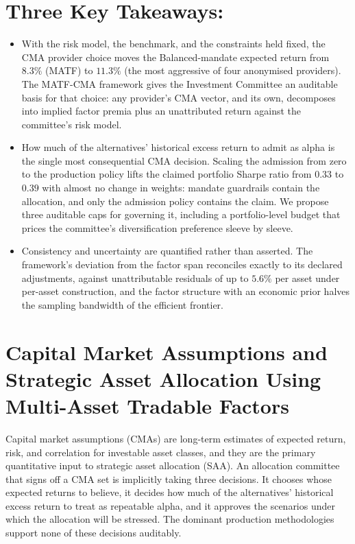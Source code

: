 \documentclass[pdftex,12pt,a4paper]{article}
\begin{document}
\newpage

\sectionfont{\MakeUppercase}

\section*{Three Key Takeaways:}
\begin{itemize}[itemsep=2pt]
	\item With the risk model, the benchmark, and the constraints held fixed, the CMA provider choice moves the Balanced-mandate expected return from $8.3\%$ (MATF) to $11.3\%$ (the most aggressive of four anonymised providers). The MATF-CMA framework gives the Investment Committee an auditable basis for that choice: any provider's CMA vector, and its own, decomposes into implied factor premia plus an unattributed return against the committee's risk model.
	\item How much of the alternatives' historical excess return to admit as alpha is the single most consequential CMA decision. Scaling the admission from zero to the production policy lifts the claimed portfolio Sharpe ratio from $0.33$ to $0.39$ with almost no change in weights: mandate guardrails contain the allocation, and only the admission policy contains the claim. We propose three auditable caps for governing it, including a portfolio-level budget that prices the committee's diversification preference sleeve by sleeve.
	\item Consistency and uncertainty are quantified rather than asserted. The framework's deviation from the factor span reconciles exactly to its declared adjustments, against unattributable residuals of up to $5.6\%$ per asset under per-asset construction, and the factor structure with an economic prior halves the sampling bandwidth of the efficient frontier.
\end{itemize}


\sectionfont{\MakeUppercase}
\section*{Capital Market Assumptions and Strategic Asset Allocation Using Multi-Asset Tradable Factors}\label{sec:intro}

Capital market assumptions (CMAs) are long-term estimates of expected return, risk, and correlation for investable asset classes, and they are the primary quantitative input to strategic asset allocation (SAA). An allocation committee that signs off a CMA set is implicitly taking three decisions. It chooses whose expected returns to believe, it decides how much of the alternatives' historical excess return to treat as repeatable alpha, and it approves the scenarios under which the allocation will be stressed. The dominant production methodologies support none of these decisions auditably.
\end{document}

